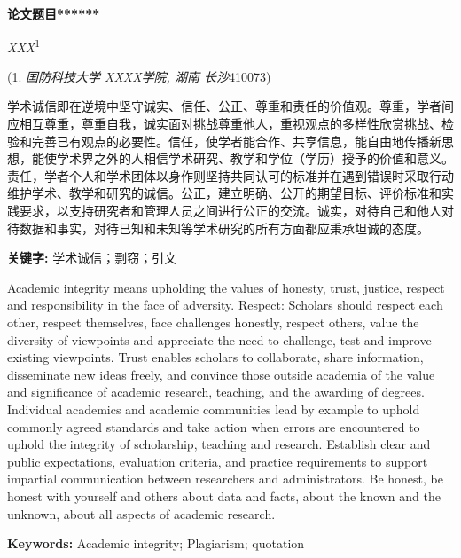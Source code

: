 \documentclass[12pt,hyperref,a4paper,UTF8]{ctexart}
\begin{document}
\cover
\thispagestyle{empty}
\newpage

\begin{center} 
  \fontsize{18pt}{16pt}
  \textbf{\selectfont 论文题目******}
\end{center}

\begin{center} 
  \textit{XXX}\textsuperscript{1}

  (1. \textit{国防科技大学 XXXX学院, 湖南 长沙}410073)
\end{center}

\begin{cnabstract}
%
  学术诚信即在逆境中坚守诚实、信任、公正、尊重和责任的价值观。尊重，学者间应相互尊重，尊重自我，诚实面对挑战尊重他人，重视观点的多样性欣赏挑战、检验和完善已有观点的必要性。信任，使学者能合作、共享信息，能自由地传播新思想，能使学术界之外的人相信学术研究、教学和学位（学历）授予的价值和意义。责任，学者个人和学术团体以身作则坚持共同认可的标准并在遇到错误时采取行动维护学术、教学和研究的诚信。公正，建立明确、公开的期望目标、评价标准和实践要求，以支持研究者和管理人员之间进行公正的交流。诚实，对待自己和他人对待数据和事实，对待已知和未知等学术研究的所有方面都应秉承坦诚的态度。

  \par\textbf{关键字: } 学术诚信；剽窃；引文
%
\end{cnabstract}

\begin{enabstract}
  Academic integrity means upholding the values of honesty, trust, justice, respect and responsibility in the face of adversity. Respect: Scholars should respect each other, respect themselves, face challenges honestly, respect others, value the diversity of viewpoints and appreciate the need to challenge, test and improve existing viewpoints. Trust enables scholars to collaborate, share information, disseminate new ideas freely, and convince those outside academia of the value and significance of academic research, teaching, and the awarding of degrees. Individual academics and academic communities lead by example to uphold commonly agreed standards and take action when errors are encountered to uphold the integrity of scholarship, teaching and research. Establish clear and public expectations, evaluation criteria, and practice requirements to support impartial communication between researchers and administrators. Be honest, be honest with yourself and others about data and facts, about the known and the unknown, about all aspects of academic research.
  \par\textbf{Keywords:} Academic integrity; Plagiarism; quotation
\end{enabstract}
\end{document}
